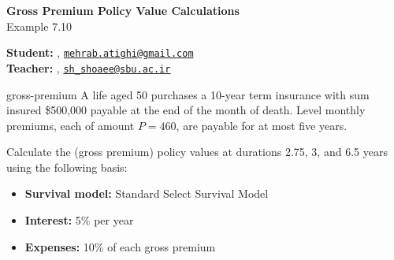 


\usepackage{actuarialsymbol}


	\begin{Large}
		\textsf{\textbf{Gross Premium Policy Value Calculations}}\\
		Example 7.10
	\end{Large}
	
	\vspace{1ex}
	
	\textsf{\textbf{Student:}} , \href{mailto:mehrab.atighi@gmail.com}{\texttt{mehrab.atighi@gmail.com}}\\
	\textsf{\textbf{Teacher:}} , \href{mailto:sh_shoaee@sbu.ac.ir}{\texttt{sh\_shoaee@sbu.ac.ir}}
	
	\vspace{2ex}
	
	\begin{problem}{}{gross-premium}
		A life aged 50 purchases a 10-year term insurance with sum insured \$500,000 payable at the end of the month of death. Level monthly premiums, each of amount $P = 460$, are payable for at most five years.
		
		Calculate the (gross premium) policy values at durations 2.75, 3, and 6.5 years using the following basis:
		\begin{itemize}
			\item \textbf{Survival model:} Standard Select Survival Model
			\item \textbf{Interest:} 5\% per year
			\item \textbf{Expenses:} 10\% of each gross premium
		\end{itemize}
	\end{problem}
	
